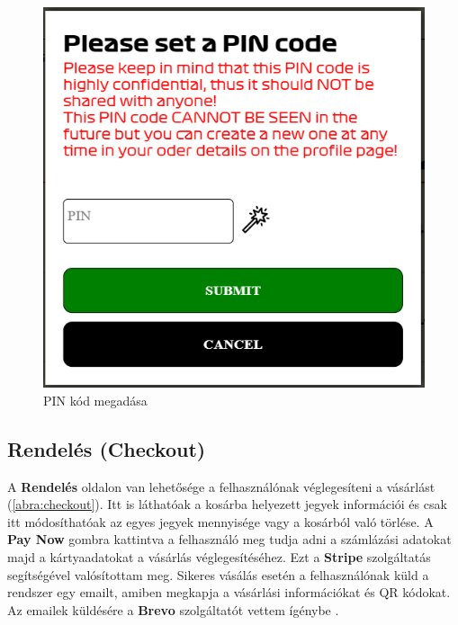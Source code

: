 \begin{figure}[!h]
	\centering
	\includegraphics[scale=0.4]{images/pinPopup}
	\caption{PIN kód megadása}
	\label{abra:pinPopup}
\end{figure}
\pagebreak

\subsection {Rendelés (Checkout)}

A \textbf{Rendelés} oldalon van lehetősége a felhasználónak véglegesíteni a vásárlást (\ref{abra:checkout}). Itt is láthatóak a kosárba helyezett jegyek információi és csak itt módosíthatóak az egyes jegyek mennyisége vagy a kosárból való törlése. A \textbf{Pay Now} gombra kattintva a felhasználó meg tudja adni a számlázási adatokat majd a kártyaadatokat a vásárlás véglegesítéséhez. Ezt a \textbf{Stripe} szolgáltatás segítségével valósítottam meg. Sikeres vásálás esetén a felhasználónak küld a rendszer egy emailt, amiben megkapja a vásárlási információkat és QR kódokat. Az emailek küldésére a \textbf{Brevo} szolgáltatót vettem ígénybe \cite{Brevo}.

